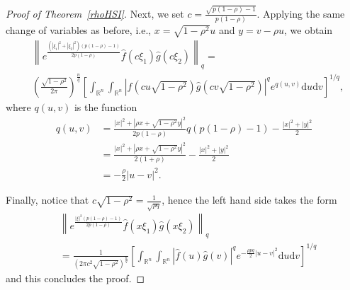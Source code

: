 \documentclass[9pt, a4paper]{amsart}
\newcommand{\1}{{\chi_{}}}%
\numberwithin{equation}{section}
\begin{document}
\begin{proof}[Proof of Theorem~\ref{rhoHSI}]
Next, we set $c=\frac{\sqrt{p(1-\rho)-1}}{p(1-\rho)}$. Applying the same change of variables as before, i.e., $x=\sqrt{1-\rho^2}u$ and $y=v-\rho u$,  we obtain 
\begin{align*}  &\left\|e^{\frac{(|\xi_1|^{2}+|\xi_2|^{2})(p(1-\rho)-1)}{2p(1-\rho)}} \widehat{f}(c\xi_{1})\widehat{g}(c\xi_{2})\right\|_{q}  = \\
&\left(\frac{\sqrt{1-\rho^{2}}}{2\pi}\right)^{\frac{n}{q}}\left[\int_{\mathbb{R}^{n}}\int_{\mathbb{R}^{n}}\left|\widehat{f}\left(cu\sqrt{1-\rho^{2}}\right)\widehat{g}\left(cv\sqrt{1-\rho^{2}}\right) \right|^{q}e^{q(u,v)}\mathrm{d}u\mathrm{d}v \right]^{1/q},
\end{align*}
where $q(u,v)$ is the function
\begin{align*}
q(u,v)&=\frac{|x|^2+|\rho x+\sqrt{1-\rho^2}y|^2}{2 p(1-\rho)}q (p(1-\rho)-1)-\frac{|x|^2+|y|^2}{2}\\
&=\frac{|x|^2+|\rho x+\sqrt{1-\rho^2}y|^2}{2 (1+\rho)}-\frac{|x|^2+|y|^2}{2} \\
&=-\frac{\rho}{2}|u-v|^2.
\end{align*}


Finally, notice that $c\sqrt{1-\rho^{2}}=\frac{1}{\sqrt{pq}}$, hence the left hand side takes the form 
\begin{align*}
&\left\|e^{\frac{|\xi|^{2}(p (1-\rho)-1)}{2p(1-\rho)}} \widehat{f}(x\xi_{1})\widehat{g}(x \xi_{2})\right\|_{q}\\
&=\frac{1}{\left(2\pi c^{2} \sqrt{1-\rho^{2}}\right)^{\frac{n}{q}}}\left[\int_{\mathbb{R}^{n}}\int_{\mathbb{R}^{n}}\left|\widehat{f}(u)\widehat{g}(v) \right|^{q}e^{-\frac{\rho p q}{2}|u-v|^2}\mathrm{d}u\mathrm{d}v \right]^{1/q}
\end{align*}
and this concludes the proof.
\end{proof}
\end{document}
